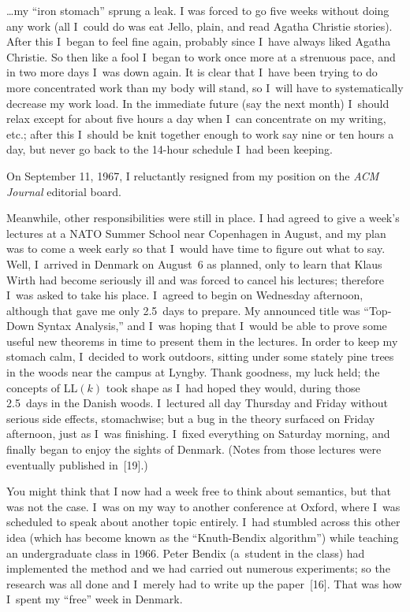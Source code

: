 {\narrower\smallskip\noindent
\dots my ``iron stomach'' sprung a leak. I was forced to go five weeks
without doing any work (all I~could do was eat Jello, plain, and read
Agatha Christie stories). After this I~began to feel fine again,
probably since I~have always liked Agatha Christie. So then like a fool
I~began to work once more at a strenuous pace, and in two more days
I~was down again. It is clear that I~have been trying to do more
concentrated work than my body will stand, so I~will have to
systematically decrease my work load. In the immediate future (say the
next month) I~should relax except for about five hours a day when
I~can concentrate on my writing, etc.; after this I~should be knit
together enough to work say nine or ten hours a day, but never go back
to the 14-hour schedule I~had been keeping.
\smallskip}

\noindent
On September 11, 1967, I reluctantly resigned from my position on the
{\sl ACM Journal\/} editorial board.

Meanwhile, other responsibilities were still in place. I had agreed to
give a week's lectures at a NATO Summer School near Copenhagen in
August, and my plan was to come a week early so that I~would have
time to figure out what to say. Well, I~arrived in Denmark on August~6
as planned, only to learn that Klaus Wirth had become seriously ill
and was forced to cancel his lectures; therefore I~was asked to take
his place. I~agreed to begin on Wednesday afternoon, although that
gave me only 2.5~days to prepare. My announced title was ``Top-Down
Syntax Analysis,'' and I~was hoping that I~would be able to prove some
useful new
theorems in time to present them in the lectures. In order to keep my
stomach calm, I~decided to work outdoors, sitting under some stately
pine trees in the woods near the campus at Lyngby. Thank goodness, my
luck held; the concepts of LL$(k)$ took shape as I~had hoped they
would, during those 2.5~days in the Danish woods. I~lectured all day
Thursday and Friday without serious side effects, stomachwise; but a
bug in the theory surfaced on Friday afternoon,
just as I~was finishing.
 I~fixed everything on Saturday
morning, and finally began to enjoy the sights of Denmark. (Notes from
those lectures were eventually published in~[19].)

You might think that I now had a week free to think about semantics,
but that was not the case. I~was on my way to another conference at
Oxford, where I~was scheduled to speak about another topic entirely.
I~had stumbled across this other idea (which has become known as the
``Knuth-Bendix algorithm'') while teaching an undergraduate class in
1966. Peter Bendix (a~student in the class) had implemented the method
and we had 
carried out numerous experiments; so the research was all done and
I~merely had to write up the paper~[16].
That was how I~spent my ``free'' week in Denmark.

